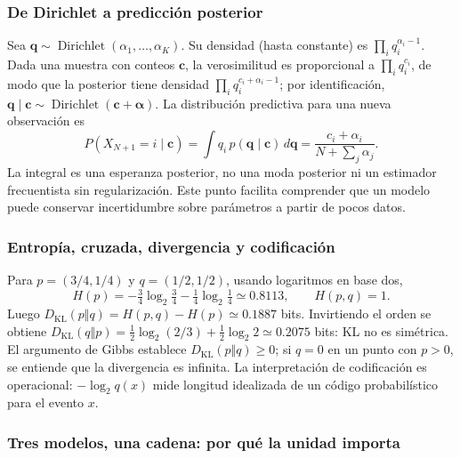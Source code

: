 \subsubsection*{De Dirichlet a predicción posterior}

Sea $\mathbf q\sim\operatorname{Dirichlet}(\alpha_1,\ldots,\alpha_K)$.
Su densidad (hasta constante) es $\prod_iq_i^{\alpha_i-1}$.
Dada una muestra con conteos $\mathbf c$, la verosimilitud es proporcional
a $\prod_iq_i^{c_i}$, de modo que la posterior tiene densidad
$\prod_iq_i^{c_i+\alpha_i-1}$; por identificación,
$\mathbf q\mid \mathbf c\sim\operatorname{Dirichlet}(\mathbf c+\boldsymbol\alpha)$.
La distribución predictiva para una nueva observación es
\[
P(X_{N+1}=i\mid\mathbf c)=\int q_i\,p(\mathbf q\mid\mathbf c)\,d\mathbf q
=\frac{c_i+\alpha_i}{N+\sum_j\alpha_j}.
\]
La integral es una esperanza posterior, no una moda posterior ni un estimador
frecuentista sin regularización. Este punto facilita comprender que un modelo
puede conservar incertidumbre sobre parámetros a partir de pocos datos.

\subsubsection*{Entropía, cruzada, divergencia y codificación}

Para $p=(3/4,1/4)$ y $q=(1/2,1/2)$, usando logaritmos en base dos,
\[
H(p)=-\tfrac34\log_2\tfrac34-\tfrac14\log_2\tfrac14\simeq0.8113,
\qquad H(p,q)=1.
\]
Luego $D_{\mathrm{KL}}(p\Vert q)=H(p,q)-H(p)\simeq0.1887$ bits.
Invirtiendo el orden se obtiene
$D_{\mathrm{KL}}(q\Vert p)=\frac12\log_2(2/3)+\frac12\log_2 2
\simeq0.2075$ bits: KL no es simétrica.
El argumento de Gibbs establece $D_{\mathrm{KL}}(p\Vert q)\geq0$;
si $q=0$ en un punto con $p>0$, se entiende que la divergencia es infinita.
La interpretación de codificación es operacional: $-\log_2 q(x)$ mide
longitud idealizada de un código probabilístico para el evento $x$.

\subsubsection*{Tres modelos, una cadena: por qué la unidad importa}

